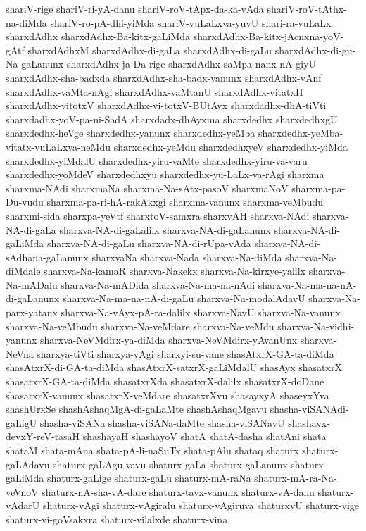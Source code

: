 {shariV-rige
shariV-ri-yA-danu
shariV-roV-tApx-da-ka-vAda
shariV-roV-tAthx-na-diMda
shariV-ro-pA-dhi-yiMda
shariV-vuLaLxva-yuvU
shari-ra-vuLaLx
sharxdAdhx
sharxdAdhx-Ba-kitx-gaLiMda
sharxdAdhx-Ba-kitx-jAcnxna-yoV-gAtf
sharxdAdhxM
sharxdAdhx-di-gaLa
sharxdAdhx-di-gaLu
sharxdAdhx-di-gu-Na-gaLanunx
sharxdAdhx-ja-Da-rige
sharxdAdhx-saMpa-nanx-nA-giyU
sharxdAdhx-sha-badxda
sharxdAdhx-sha-badx-vanunx
sharxdAdhx-vAnf
sharxdAdhx-vaMta-nAgi
sharxdAdhx-vaMtanU
sharxdAdhx-vitatxH
sharxdAdhx-vitotxV
sharxdAdhx-vi-totxV-BUtAvx
sharxdadhx-dhA-tiVti
sharxdadhx-yoV-pa-ni-SadA
sharxdadx-dhAyxma
sharxdedhx
sharxdedhxgU
sharxdedhx-heVge
sharxdedhx-yanunx
sharxdedhx-yeMba
sharxdedhx-yeMba-vitatx-vuLaLxva-neMdu
sharxdedhx-yeMdu
sharxdedhxyeV
sharxdedhx-yiMda
sharxdedhx-yiMdalU
sharxdedhx-yiru-vaMte
sharxdedhx-yiru-va-varu
sharxdedhx-yoMdeV
sharxdedhxyu
sharxdedhx-yu-LaLx-va-rAgi
sharxma
sharxma-NAdi
sharxmaNa
sharxma-Na-sAtx-pasoV
sharxmaNoV
sharxma-pa-Du-vudu
sharxma-pa-ri-hA-rakAkxgi
sharxma-vanunx
sharxma-veMbudu
sharxmi-sida
sharxpa-yeVtf
sharxtoV-samxra
sharxvAH
sharxva-NAdi
sharxva-NA-di-gaLa
sharxva-NA-di-gaLalilx
sharxva-NA-di-gaLanunx
sharxva-NA-di-gaLiMda
sharxva-NA-di-gaLu
sharxva-NA-di-rUpa-vAda
sharxva-NA-di-sAdhana-gaLanunx
sharxvaNa
sharxva-Nada
sharxva-Na-diMda
sharxva-Na-diMdale
sharxva-Na-kamaR
sharxva-Nakekx
sharxva-Na-kirxye-yalilx
sharxva-Na-mADalu
sharxva-Na-mADida
sharxva-Na-ma-na-nAdi
sharxva-Na-ma-na-nA-di-gaLanunx
sharxva-Na-ma-na-nA-di-gaLu
sharxva-Na-modalAdavU
sharxva-Na-parx-yatanx
sharxva-Na-vAyx-pA-ra-dalilx
sharxva-NavU
sharxva-Na-vanunx
sharxva-Na-veMbudu
sharxva-Na-veMdare
sharxva-Na-veMdu
sharxva-Na-vidhi-yanunx
sharxva-NeVMdirx-ya-diMda
sharxva-NeVMdirx-yAvanUnx
sharxva-NeVna
sharxya-tiVti
sharxya-vAgi
sharxyi-su-vane
shasAtxrX-GA-ta-diMda
shasAtxrX-di-GA-ta-diMda
shasAtxrX-satxrX-gaLiMdalU
shasAyx
shasatxrX
shasatxrX-GA-ta-diMda
shasatxrXda
shasatxrX-dalilx
shasatxrX-doDane
shasatxrX-vanunx
shasatxrX-veMdare
shasatxrXvu
shasayxyA
shaseyxYva
shashUrxSe
shashAshaqMgA-di-gaLaMte
shashAshaqMgavu
shasha-viSANAdi-gaLigU
shasha-viSANa
shasha-viSANa-daMte
shasha-viSANavU
shashavx-devxY-reV-tasaH
shashayaH
shashayoV
shatA
shatA-dasha
shatAni
shata
shataM
shata-mAna
shata-pA-li-naSuTx
shata-pAlu
shataq
shaturx
shaturx-gaLAdavu
shaturx-gaLAgu-vavu
shaturx-gaLa
shaturx-gaLanunx
shaturx-gaLiMda
shaturx-gaLige
shaturx-gaLu
shaturx-mA-raNa
shaturx-mA-ra-Na-veVnoV
shaturx-nA-sha-vA-dare
shaturx-tavx-vanunx
shaturx-vA-danu
shaturx-vAdarU
shaturx-vAgi
shaturx-vAgiralu
shaturx-vAgiruva
shaturxvU
shaturx-vige
shaturx-vi-goVsakxra
shaturx-vilalxde
shaturx-vina
}
